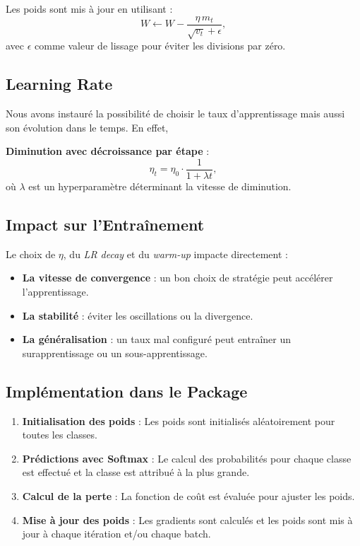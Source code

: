 \documentclass[a4paper,12pt]{article}
\begin{document}
Les poids sont mis à jour en utilisant :
\[
W \leftarrow W - \frac{\eta \, m_t}{\sqrt{v_t} + \epsilon},
\]
avec \( \epsilon \) comme valeur de lissage pour éviter les divisions par zéro.
\subsection{Learning Rate}
Nous avons instauré la possibilité de choisir le taux d'apprentissage mais aussi son évolution dans le temps. En effet, 

    \item \textbf{Diminution avec décroissance par étape} : 
    \[
    \eta_t = \eta_0 \cdot \frac{1}{1 + \lambda t},
    \]
    où \( \lambda \) est un hyperparamètre déterminant la vitesse de diminution.

    \subsection{Impact sur l’Entraînement}
Le choix de \( \eta \), du \textit{LR decay} et du \textit{warm-up} impacte directement :
\begin{itemize}
    \item \textbf{La vitesse de convergence} : un bon choix de stratégie peut accélérer l’apprentissage.
    \item \textbf{La stabilité} : éviter les oscillations ou la divergence.
    \item \textbf{La généralisation} : un taux mal configuré peut entraîner un surapprentissage ou un sous-apprentissage.
\end{itemize}

\subsection{Implémentation dans le Package}
\begin{enumerate}
    \item \textbf{Initialisation des poids} : Les poids sont initialisés aléatoirement pour toutes les classes.
    \item \textbf{Prédictions avec Softmax} : Le calcul des probabilités pour chaque classe est effectué et la classe est attribué à la plus grande.
    \item \textbf{Calcul de la perte} : La fonction de coût est évaluée pour ajuster les poids.
    \item \textbf{Mise à jour des poids} : Les gradients sont calculés et les poids sont mis à jour à chaque itération et/ou chaque batch.
\end{enumerate}
\end{document}
